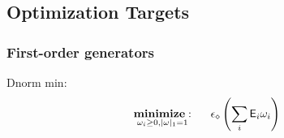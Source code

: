\documentclass[aps,nofootinbib,pra,notitlepage,twocolumn]{revtex4-1}
\begin{document}
\subsection{Optimization Targets}
\subsubsection{First-order generators} %
\label{sub:first_order_generators}

Dnorm min:
\begin{equation}\label{eq:ddmin}
  \begin{split}
    &\underset{\omega_i\geq0, |\omega|_1=1}{\textbf{minimize}: } \hspace{.5cm} \epsilon_\diamond\left(\sum_i\mathsf{E}_i \omega_i\right)
  \end{split}
\end{equation}
\end{document}
